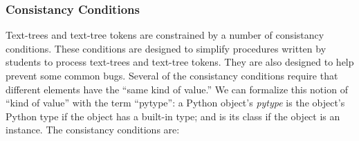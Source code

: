 \documentclass[11pt]{article}
\begin{document}
  \subsubsection{Consistancy Conditions}
  \label{sec:consistancy}

  Text-trees and text-tree tokens are constrained by a number of
  consistancy conditions.  These conditions are designed to simplify
  procedures written by students to process text-trees and text-tree
  tokens.  They are also designed to help prevent some common bugs.
  Several of the consistancy conditions require that different
  elements have the ``same kind of value.''  We can formalize this
  notion of ``kind of value'' with the term ``pytype'': a Python
  object's \emph{pytype} is the object's Python type if the object has
  a built-in type; and is its class if the object is an instance.  The
  consistancy conditions are:
\end{document}
